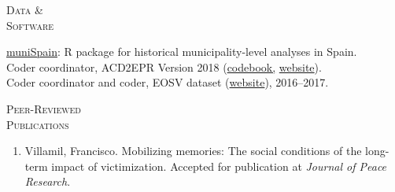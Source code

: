 \documentclass[a4paper, 11pt]{article}
\begin{document}
\vspace{20pt}


\noindent
\begin{minipage}[t]{0.14\textwidth}
  \flushleft
  \textsc{\small Data \&\\Software}
\end{minipage}
\begin{minipage}[t]{0.86\textwidth}
	\href{https://github.com/franvillamil/muniSpain}{muniSpain}: R package for historical municipality-level analyses in Spain.\\
  Coder coordinator, ACD2EPR Version 2018 (\href{https://icr.ethz.ch/data/epr/acd2epr/ACD2EPR-2018_Codebook.pdf}{codebook,} \href{https://icr.ethz.ch/data/epr/acd2epr/}{website}).\\
  Coder coordinator and coder, EOSV dataset (\href{https://snis.ch/project/civilian-victimization-conflict-escalation/}{website}), 2016--2017.
\end{minipage}

\vspace{20pt}


\noindent
\begin{minipage}[t]{0.14\textwidth}
  \flushleft
  \textsc{\small Peer-Reviewed\\Publications}
\end{minipage}
\begin{minipage}[t]{0.86\textwidth}
	\vspace{-7pt}
  \begin{enumerate}[leftmargin=*, nolistsep]
  \item Villamil, Francisco. Mobilizing memories: The social conditions of the long-term impact of victimization. Accepted for publication at \textit{Journal of Peace Research}.
  \end{enumerate}

\end{minipage}

\vspace{20pt}

\end{document}
